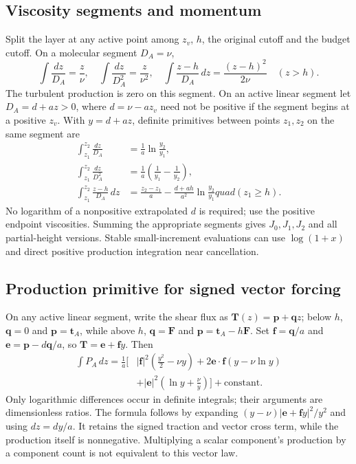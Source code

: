 \documentclass[11pt,a4paper]{article}
\numberwithin{equation}{section}
\begin{document}
\subsection{Viscosity segments and momentum}
Split the layer at any active point among $z_v$, $h$, the original
cutoff and the budget cutoff. On a molecular segment $D_A=\nu$,
\begin{equation}
 \int\frac{dz}{D_A}=\frac z\nu,\quad
 \int\frac{dz}{D_A^2}=\frac z{\nu^2},\quad
 \int\frac{z-h}{D_A}\,dz=\frac{(z-h)^2}{2\nu}
 \quad(z>h).
 \label{eq:integrals-molecular}
\end{equation}
The turbulent production is zero on this segment. On an active
linear segment let $D_A=d+az>0$, where $d=\nu-az_v$ need not be
positive if the segment begins at a positive $z_v$. With $y=d+az$,
definite primitives between points $z_1,z_2$ on the same segment are
\begin{equation}
 \begin{aligned}
 \int_{z_1}^{z_2}\frac{dz}{D_A}
 &=\frac1a\ln\frac{y_2}{y_1},\\
 \int_{z_1}^{z_2}\frac{dz}{D_A^2}
 &=\frac1a\left(\frac1{y_1}-\frac1{y_2}\right),\\
 \int_{z_1}^{z_2}\frac{z-h}{D_A}\,dz
 &=\frac{z_2-z_1}{a}
  -\frac{d+ah}{a^2}\ln\frac{y_2}{y_1}quad(z_1\geq h).
 \end{aligned}
 \label{eq:integrals-linear}
\end{equation}
No logarithm of a nonpositive extrapolated $d$ is required; use the
positive endpoint viscosities. Summing the appropriate segments gives
$J_0,J_1,J_2$ and all partial-height versions. Stable small-increment
evaluations can use $\log(1+x)$ and direct positive production
integration near cancellation.

\subsection{Production primitive for signed vector forcing}
On any active linear segment, write the shear flux as
$\bm T(z)=\bm p+\bm qz$; below $h$, $\bm q=0$ and
$\bm p=\bm t_A$, while above $h$, $\bm q=\bm F$ and
$\bm p=\bm t_A-h\bm F$.
Set $\bm f=\bm q/a$ and $\bm e=\bm p-d\bm q/a$, so
$\bm T=\bm e+\bm f y$. Then
\begin{equation}
 \begin{aligned}
 \int P_A\,dz=\frac1a\bigg[
 &|\bm f|^2\left(\frac{y^2}{2}-\nu y\right)
 +2\bm e\cdot\bm f\left(y-\nu\ln y\right)\\
 &+|\bm e|^2\left(\ln y+\frac\nu y\right)\bigg]+\mathrm{constant}.
 \end{aligned}
 \label{eq:production-primitive}
\end{equation}
Only logarithmic differences occur in definite integrals; their
arguments are dimensionless ratios. The formula follows by expanding
$(y-\nu)|\bm e+\bm f y|^2/y^2$ and using $dz=dy/a$.
It retains the signed traction and vector cross term, while the
production itself is nonnegative. Multiplying a scalar component's
production by a component count is not equivalent to this vector law.
\end{document}
